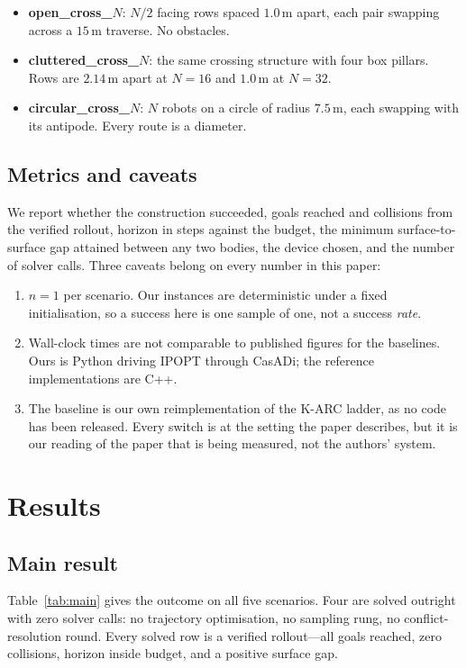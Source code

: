 \documentclass[conference]{IEEEtran}
\begin{document}
\begin{itemize}
\item \textbf{open\_cross\_$N$}: $N/2$ facing rows spaced $1.0$\,m apart, each pair
swapping across a $15$\,m traverse. No obstacles.
\item \textbf{cluttered\_cross\_$N$}: the same crossing structure with four box pillars.
Rows are $2.14$\,m apart at $N{=}16$ and $1.0$\,m at $N{=}32$.
\item \textbf{circular\_cross\_$N$}: $N$ robots on a circle of radius $7.5$\,m, each
swapping with its antipode. Every route is a diameter.
\end{itemize}

\subsection{Metrics and caveats}
We report whether the construction succeeded, goals reached and collisions from the
verified rollout, horizon in steps against the budget, the minimum surface-to-surface gap
attained between any two bodies, the device chosen, and the number of solver calls. Three
caveats belong on every number in this paper:

\begin{enumerate}
\item $n = 1$ per scenario. Our instances are deterministic under a fixed initialisation,
so a success here is one sample of one, not a success \emph{rate}.
\item Wall-clock times are not comparable to published figures for the baselines. Ours is
Python driving IPOPT through CasADi; the reference implementations are C++.
\item The baseline is our own reimplementation of the K-ARC ladder, as no code has been
released. Every switch is at the setting the paper describes, but it is our reading of the
paper that is being measured, not the authors' system.
\end{enumerate}

\section{Results}

\subsection{Main result}

Table~\ref{tab:main} gives the outcome on all five scenarios. Four are solved outright with
zero solver calls: no trajectory optimisation, no sampling rung, no conflict-resolution
round. Every solved row is a verified rollout---all goals reached, zero collisions, horizon
inside budget, and a positive surface gap.
\end{document}
